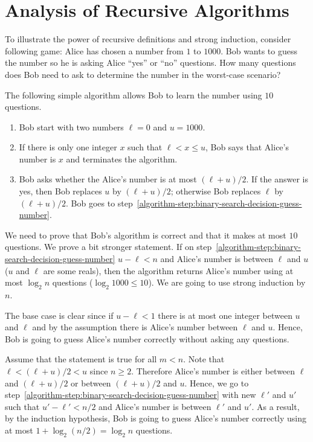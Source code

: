 \section{Analysis of Recursive Algorithms}
\label{section:strong-induction-recursive}
To illustrate the power of recursive definitions and strong induction, consider
following game: Alice has chosen a number from $1$ to $1000$. Bob wants to
guess the number so he is asking Alice ``yes'' or ``no'' questions.
How many questions does Bob need to ask to determine the number in the
worst-case scenario?

The following simple algorithm allows Bob to learn the number using $10$
questions.

\begin{enumerate}
  \item Bob start with two numbers $\ell = 0$ and $u = 1000$.
  \item \label{algorithm-step:binary-search-result-guess-number}
    If there is only one integer $x$ such that $\ell < x \le u$, Bob says that
    Alice's number is $x$ and terminates the algorithm.
  \item \label{algorithm-step:binary-search-decision-guess-number}
    Bob asks whether the Alice's number is at most $(\ell + u) / 2$. If the
    answer is yes, then Bob replaces $u$ by $(\ell + u) / 2$; otherwise Bob
    replaces $\ell$ by $(\ell + u) / 2$.
    Bob goes to step~\ref{algorithm-step:binary-search-decision-guess-number}.
\end{enumerate}

We need to prove that Bob's algorithm is correct and that it makes at most $10$
questions. We prove a bit stronger statement. If on
step~\ref{algorithm-step:binary-search-decision-guess-number} $u - \ell < n$ and
Alice's number is between $\ell$ and $u$ ($u$ and $\ell$ are some reals), then
the algorithm returns Alice's number using at most $\log_2 n$ questions 
($\log_2 1000 \le 10$). We are going to use strong induction by $n$. 

The base case is clear since if $u - \ell < 1$ there is at most one integer
between $u$ and $\ell$ and by the assumption there is Alice's number between
$\ell$ and $u$. Hence, Bob is going to guess Alice's number correctly without asking
any questions.

Assume that the statement is true for all $m < n$. Note that 
$\ell < (\ell + u) / 2 < u$ since $n \ge 2$. Therefore Alice's number is either
between $\ell$ and $(\ell + u) / 2$ or between $(\ell + u) / 2$ and $u$. Hence,
we go to step~\ref{algorithm-step:binary-search-decision-guess-number} with new
$\ell'$ and $u'$ such that $u' - \ell' < n / 2$ and Alice's number is between
$\ell'$ and $u'$. As a result, by the induction hypothesis, Bob is going to
guess Alice's number correctly using at most $1 + \log_2 (n / 2) = \log_2 n$
questions.

